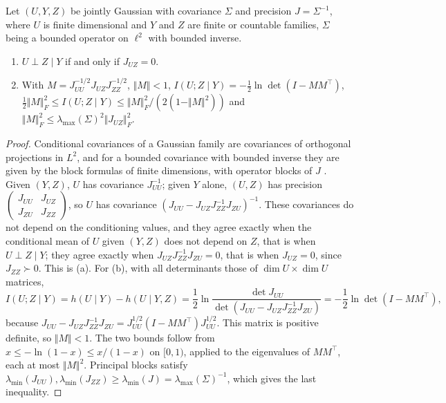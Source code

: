 \begin{lemma}\label{lem:col-gaussian}
Let $(U,Y,Z)$ be jointly Gaussian with covariance $\Sigma$ and precision $J=\Sigma^{-1}$, where $U$ is finite dimensional and $Y$ and $Z$ are finite or countable families, $\Sigma$ being a bounded operator on $\ell^2$ with bounded inverse.
\begin{enumerate}
\item[(a)] $U\perp Z\mid Y$ if and only if $J_{UZ}=0$.
\item[(b)] With $M=J_{UU}^{-1/2}J_{UZ}J_{ZZ}^{-1/2}$, $\Vert M\Vert<1$, $I(U;Z\mid Y)=-\frac12\ln\det(I-MM^\top)$, $\frac12\Vert M\Vert_F^2\le I(U;Z\mid Y)\le\Vert M\Vert_F^2/(2(1-\Vert M\Vert^2))$ and $\Vert M\Vert_F^2\le\lambda_{\max}(\Sigma)^2\Vert J_{UZ}\Vert_F^2$.
\end{enumerate}
\end{lemma}
\begin{proof}
Conditional covariances of a Gaussian family are covariances of orthogonal projections in $L^2$, and for a bounded covariance with bounded inverse they are given by the block formulas of finite dimensions, with operator blocks of $J$ \citep{lauritzen1996graphical}. Given $(Y,Z)$, $U$ has covariance $J_{UU}^{-1}$; given $Y$ alone, $(U,Z)$ has precision $\begin{pmatrix}J_{UU}&J_{UZ}\\J_{ZU}&J_{ZZ}\end{pmatrix}$, so $U$ has covariance $(J_{UU}-J_{UZ}J_{ZZ}^{-1}J_{ZU})^{-1}$. These covariances do not depend on the conditioning values, and they agree exactly when the conditional mean of $U$ given $(Y,Z)$ does not depend on $Z$, that is when $U\perp Z\mid Y$; they agree exactly when $J_{UZ}J_{ZZ}^{-1}J_{ZU}=0$, that is when $J_{UZ}=0$, since $J_{ZZ}\succ0$. This is (a). For (b), with all determinants those of $\dim U\times\dim U$ matrices,
\[
I(U;Z\mid Y)=h(U\mid Y)-h(U\mid Y,Z)=\frac12\ln\frac{\det J_{UU}}{\det(J_{UU}-J_{UZ}J_{ZZ}^{-1}J_{ZU})}=-\frac12\ln\det(I-MM^\top),
\]
because $J_{UU}-J_{UZ}J_{ZZ}^{-1}J_{ZU}=J_{UU}^{1/2}(I-MM^\top)J_{UU}^{1/2}$. This matrix is positive definite, so $\Vert M\Vert<1$. The two bounds follow from $x\le-\ln(1-x)\le x/(1-x)$ on $[0,1)$, applied to the eigenvalues of $MM^\top$, each at most $\Vert M\Vert^2$. Principal blocks satisfy $\lambda_{\min}(J_{UU}),\lambda_{\min}(J_{ZZ})\ge\lambda_{\min}(J)=\lambda_{\max}(\Sigma)^{-1}$, which gives the last inequality.
\end{proof}

